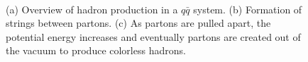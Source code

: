 \begin{figure}[htbm!]
 \centering
{}\\
 \caption{(a) Overview of hadron production in a $q\bar{q}$ system. (b) Formation of strings between partons. (c) As partons are pulled apart, the potential energy increases and eventually partons are created out of the vacuum to produce colorless hadrons.}
 \label{fig:StringFormation}
\end{figure}

